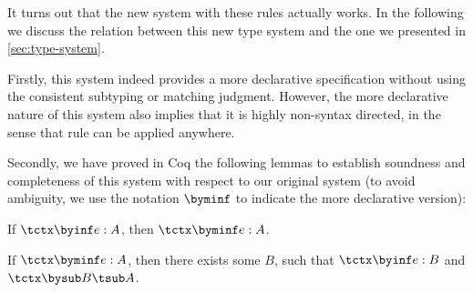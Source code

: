 It turns out that the new system with these rules actually works. In the
following we discuss the relation between this new type system and the one we
presented in \cref{sec:type-system}.

Firstly, this system indeed provides a more declarative specification without
using the consistent subtyping or matching judgment. However, the more
declarative nature of this system also implies that it is highly non-syntax
directed, in the sense that rule  can be applied anywhere.


Secondly, we have proved in Coq the following lemmas to establish soundness and
completeness of this system with respect to our original system (to avoid
ambiguity, we use the notation $\byminf$ to indicate the more declarative
version):
\begin{clemma}
  If $\tctx \byinf e : A$, then $\tctx \byminf e : A$.
\end{clemma}
\begin{clemma}
  If $\tctx \byminf e : A$, then there exists some $B$, such that $\tctx \byinf e : B$ and $\tctx \bysub B \tsub A$.
\end{clemma}

